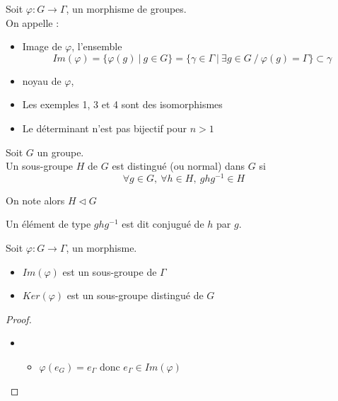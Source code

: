 \documentclass[../main.tex]{subfile}
\begin{document}

\begin{defi}
	Soit $\varphi : G \to \Gamma$, un morphisme de groupes.\\
	On appelle : \\
\begin{itemize}	
	\item Image de $\varphi$, l'ensemble
	$$Im (\varphi) = \{\varphi(g) \ | \ g \in G\} = \{\gamma \in \Gamma \ | \ \exists g \in G \ / \ \varphi(g) = \Gamma\} \subset \gamma$$

	\item noyau de $\varphi$, 
\end{itemize}
\end{defi}

\begin{rema}
\begin{itemize}	
	\item Les exemples 1, 3 et 4 sont des isomorphismes
	\item Le déterminant n'est pas bijectif pour $n > 1$
\end{itemize}
\end{rema}

\begin{defi}
	Soit $G$ un groupe.\\
	Un sous-groupe $H$ de $G$ est distingué (ou normal) dans $G$ si 
	$$\forall g \in G, \ \forall h \in H, \ ghg^{-1} \in H$$
\begin{nota}	
	On note alors $H \triangleleft G$
\end{nota}
	Un élément de type $ghg^{-1}$ est dit conjugué de $h$ par $g$.
\end{defi}

\begin{prop}
	Soit $\varphi : G \to \Gamma$, un morphisme.\\
\begin{itemize}	
	\item $Im(\varphi)$ est un sous-groupe de $\Gamma$
	\item $Ker(\varphi)$ est un sous-groupe distingué de $G$
\end{itemize}
\end{prop}

\begin{proof}
\begin{itemize}	
	\item 
\begin{itemize}	
	\item $\varphi(e_G)= e_\Gamma$ donc $e_\Gamma \in Im(\varphi)$
\end{itemize}
\end{itemize}
\end{proof}
\end{document}
